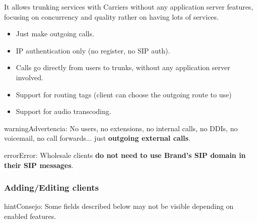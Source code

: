 \documentclass[letterpaper,10pt,spanish]{sphinxmanual}
\begin{document}
It allows trunking services with Carriers without any application server features,
focusing on concurrency and quality rather on having lots of services.
\begin{itemize}
\item {} 
Just make outgoing calls.

\item {} 
IP authentication only (no register, no SIP auth).

\item {} 
Calls go directly from users to trunks, without any application server involved.

\item {} 
Support for routing tags (client can choose the outgoing route to use)

\item {} 
Support for audio transcoding.

\end{itemize}

\begin{notice}{warning}{Advertencia:}
No users, no extensions, no internal calls, no DDIs, no voicemail, no call forwards...
just \textbf{outgoing external calls}.
\end{notice}

\begin{notice}{error}{Error:}
Wholesale clients \textbf{do not need to use Brand's SIP domain in their SIP messages}.
\end{notice}


\subsubsection{Adding/Editing clients}
\label{administration_portal/brand/clients/wholesale:adding-editing-clients}
\begin{notice}{hint}{Consejo:}
Some fields described below may not be visible depending on enabled features.
\end{notice}
\end{document}
